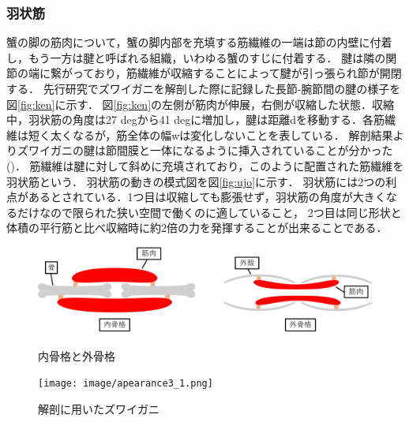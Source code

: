 \subsubsection{羽状筋}
蟹の脚の筋肉について，蟹の脚内部を充填する筋繊維の一端は節の内壁に付着し，もう一方は腱と呼ばれる組織，いわゆる蟹のすじに付着する．
腱は隣の関節の端に繋がっており，筋繊維が収縮することによって腱が引っ張られ節が開閉する．
先行研究でズワイガニを解剖した際に記録した長節-腕節間の腱の様子を図\ref{fig:ken}に示す．
図\ref{fig:ken}の左側が筋肉が伸展，右側が収縮した状態．収縮中，羽状筋の角度は27 degから41 degに増加し，腱は距離dを移動する．各筋繊維は短く太くなるが，筋全体の幅wは変化しないことを表している．
解剖結果よりズワイガニの腱は節間膜と一体になるように挿入されていることが分かった(\cite{hasegawa})．
筋繊維は腱に対して斜めに充填されており，このように配置された筋繊維を羽状筋という．
羽状筋の動きの模式図を図\ref{fig:ujo}に示す．
羽状筋には2つの利点があるとされている．1つ目は収縮しても膨張せず，羽状筋の角度が大きくなるだけなので限られた狭い空間で働くのに適していること，
2つ目は同じ形状と体積の平行筋と比べ収縮時に約2倍の力を発揮することが出来ることである\cite{warner1977biology}．
\begin{figure}[b]
  \begin{minipage}{0.49\hsize}
    \vspace{10mm}
    \centering
    \includegraphics[scale=0.058]{image/kokkaku.png}
    \vspace{5mm}
    \caption{内骨格と外骨格}
    \label{fig:naigai}
  \end{minipage}
  \begin{minipage}{0.49\hsize}
    \centering
    \texttt{[image: image/apearance3\_1.png]}
    \caption{解剖に用いたズワイガニ\cite{hasegawa}}
    \label{fig:zuwai}
  \end{minipage}
\end{figure}
